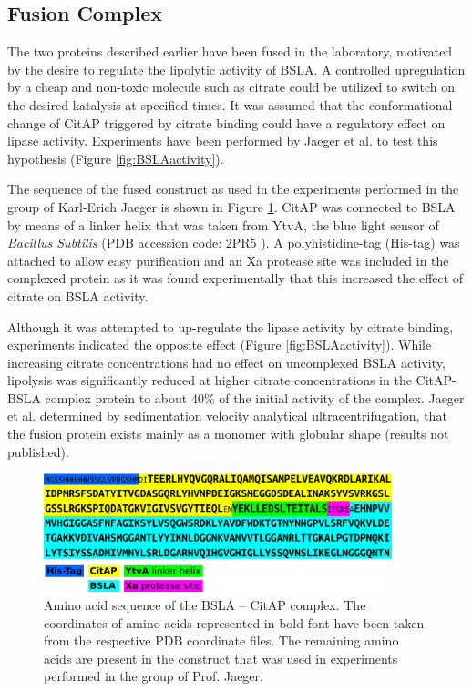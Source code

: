 \documentclass[english, a4paper, 12pt, titlepage, draft]{article}
\newcommand{\PDB}[1]{
    \href{http://pdb.rcsb.org/pdb/explore/explore.do?structureId=#1}{#1}
}
\begin{document}
\subsection{Fusion Complex}

The two proteins described earlier have been fused in the laboratory, motivated by the desire to regulate the lipolytic activity of BSLA.
A controlled upregulation by a cheap and non-toxic molecule such as citrate could be utilized to switch on the desired katalysis at specified times.
It was assumed that the conformational change of CitAP triggered by citrate binding could have a regulatory effect on lipase activity.
Experiments have been performed by Jaeger et al. to test this hypothesis (Figure \ref{fig:BSLAactivity}).

The sequence of the fused construct as used in the experiments performed in the group of Karl-Erich Jaeger is shown in Figure \ref{fig:complex_sequence}.
CitAP was connected to BSLA by means of a linker helix that was taken from YtvA, the blue light sensor of \textit{Bacillus Subtilis} (PDB accession code: \PDB{2PR5}).
A polyhistidine-tag (His-tag) was attached to allow easy purification and
an Xa protease site was included in the complexed protein as it was found experimentally that this increased the effect of citrate on BSLA activity.

Although it was attempted to up-regulate the lipase activity by citrate binding, experiments indicated the opposite effect (Figure \ref{fig:BSLAactivity}).
While increasing citrate concentrations had no effect on uncomplexed BSLA activity, lipolysis was significantly reduced at higher citrate concentrations in the CitAP-BSLA complex protein to about 40\% of the initial activity of the complex.
Jaeger et al. determined by sedimentation velocity analytical ultracentrifugation, that the fusion protein exists mainly as a monomer with globular shape (results not published).




\begin{figure}
    \centering
    \includegraphics[width=0.9\textwidth]{figures/Complex_sequence/Complex_sequence.pdf}
    \caption{Amino acid sequence of the BSLA -- CitAP complex. The coordinates of amino acids represented in bold font have been taken from the respective PDB coordinate files.
    The remaining amino acids are present in the construct that was used in experiments performed in the group of Prof. Jaeger.}
    \label{fig:complex_sequence}
\end{figure}       
\end{document}
